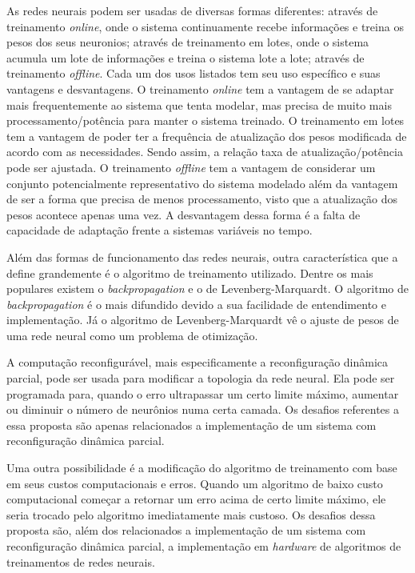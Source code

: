 \documentclass[11pt,a4paper,oneside]{book}
\begin{document}
As redes neurais podem ser usadas de diversas formas diferentes: atrav\'es de treinamento \textit{online}, onde o sistema continuamente recebe informa\c{c}\~oes e treina os pesos dos seus neuronios; atrav\'es de treinamento em lotes, onde o sistema acumula um lote de informa\c{c}\~oes e treina o sistema lote a lote; atrav\'es de treinamento \textit{offline}.
Cada um dos usos listados tem seu uso específico e suas vantagens e desvantagens.
O treinamento \textit{online} tem a vantagem de se adaptar mais frequentemente ao sistema que tenta modelar, mas precisa de muito mais processamento/potência para manter o sistema treinado.
O treinamento em lotes tem a vantagem de poder ter a frequência de atualiza\c{c}\~ao dos pesos modificada de acordo com as necessidades.
Sendo assim, a rela\c{c}\~ao taxa de atualiza\c{c}\~ao/potência pode ser ajustada.
O treinamento \textit{offline} tem a vantagem de considerar um conjunto potencialmente representativo do sistema modelado al\'em da vantagem de ser a forma que precisa de menos processamento, visto que a atualiza\c{c}\~ao dos pesos acontece apenas uma vez.
A desvantagem dessa forma \'e a falta de capacidade de adapta\c{c}\~ao frente a sistemas vari\'aveis no tempo.

Al\'em das formas de funcionamento das redes neurais, outra característica que a define grandemente \'e o algoritmo de treinamento utilizado.
Dentre os mais populares existem o \textit{backpropagation} e o de Levenberg-Marquardt.
O algoritmo de \textit{backpropagation} \'e o mais difundido devido a sua facilidade de entendimento e implementa\c{c}\~ao.
J\'a o algoritmo de Levenberg-Marquardt vê o ajuste de pesos de uma rede neural como um problema de otimiza\c{c}\~ao.

A computa\c{c}\~ao reconfigur\'avel, mais especificamente a reconfigura\c{c}\~ao dinâmica parcial, pode ser usada para modificar a topologia da rede neural.
Ela pode ser programada para, quando o erro ultrapassar um certo limite m\'aximo, aumentar ou diminuir o n\'umero de neur\^onios numa certa camada.
Os desafios referentes a essa proposta s\~ao apenas relacionados a implementa\c{c}\~ao de um sistema com reconfigura\c{c}\~ao dinâmica parcial.

Uma outra possibilidade \'e a modifica\c{c}\~ao do algoritmo de treinamento com base em seus custos computacionais e erros.
Quando um algoritmo de baixo custo computacional come\c{c}ar a retornar um erro acima de certo limite m\'aximo, ele seria trocado pelo algoritmo imediatamente mais custoso.
Os desafios dessa proposta s\~ao, al\'em dos relacionados a implementa\c{c}\~ao de um sistema com reconfigura\c{c}\~ao dinâmica parcial, a implementa\c{c}\~ao em \textit{hardware} de algoritmos de treinamentos de redes neurais.
\end{document}
